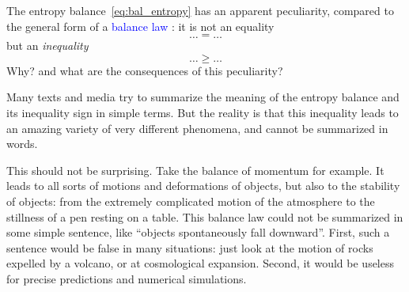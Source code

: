 \documentclass[a4paper,12pt,%
onecolumn,oneside,%
british%
]{memoir}
\renewcommand*{\|}[1][]{\nonscript\:#1\vert\nonscript\:\mathopen{}}
\newcommand*{\sect}{\S}%
\renewcommand*{\autoref}[3][\sect\,\ref]{\textcolor{blue}{#3}
\raisebox{0.6ex}{\color{blue}\miniscule%
\faIcon{angle-right}%
\;#1{#2}\;p.\,\pageref{#2}}}
\begin{document}

The entropy balance~\eqref{eq:bal_entropy} has an apparent peculiarity, compared to the general form of a \autoref{sec:balance_laws}{balance law}: it is not an equality
$$\dotso=\dotso$$
but an \emph{inequality}
$$\dotso\ge\dotso$$
Why? and what are the consequences of this peculiarity?

\medskip

Many texts and media try to summarize the meaning of the entropy balance and its inequality sign in simple terms. But the reality is that this inequality leads to an amazing variety of very different phenomena, and cannot be summarized in words.

This should not be surprising. Take the %
balance of momentum for example. It leads to all sorts of motions and deformations of objects, but also to the stability of objects: from the extremely complicated motion of the atmosphere to the stillness of a pen resting on a table. This balance law could not be summarized in some simple sentence, like \enquote{objects spontaneously fall downward}. First, such a sentence would be false in many situations: just look at the motion of rocks expelled by a volcano, or at cosmological expansion. Second, it would be useless for precise predictions and numerical simulations.
\end{document}

